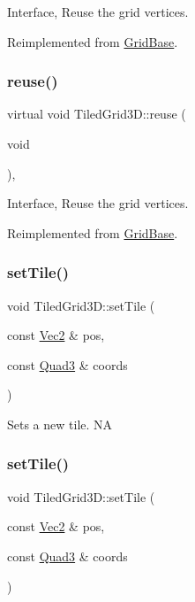 Interface, Reuse the grid vertices. 

Reimplemented from \hyperlink{classGridBase_a3567fe2ec6ea038325944d49a7bde37d}{Grid\+Base}.

\mbox{\label{classTiledGrid3D_a5c415f064b5c2364ff8e27f33784db08}} 
\subsubsection{\texorpdfstring{reuse()}{reuse()}\hspace{0.1cm}{\footnotesize\ttfamily [2/2]}}
{\footnotesize\ttfamily virtual void Tiled\+Grid3\+D\+::reuse (\begin{DoxyParamCaption}\item[{void}]{ }\end{DoxyParamCaption})\hspace{0.3cm}{\ttfamily [override]}, {\ttfamily [virtual]}}

Interface, Reuse the grid vertices. 

Reimplemented from \hyperlink{classGridBase_a3567fe2ec6ea038325944d49a7bde37d}{Grid\+Base}.

\mbox{\label{classTiledGrid3D_ac835fb269e1bd0447c63d645efbb85b8}} 
\subsubsection{\texorpdfstring{set\+Tile()}{setTile()}\hspace{0.1cm}{\footnotesize\ttfamily [1/2]}}
{\footnotesize\ttfamily void Tiled\+Grid3\+D\+::set\+Tile (\begin{DoxyParamCaption}\item[{const \hyperlink{classVec2}{Vec2} \&}]{pos,  }\item[{const \hyperlink{structQuad3}{Quad3} \&}]{coords }\end{DoxyParamCaption})}

Sets a new tile.  NA \mbox{\label{classTiledGrid3D_ac835fb269e1bd0447c63d645efbb85b8}} 
\subsubsection{\texorpdfstring{set\+Tile()}{setTile()}\hspace{0.1cm}{\footnotesize\ttfamily [2/2]}}
{\footnotesize\ttfamily void Tiled\+Grid3\+D\+::set\+Tile (\begin{DoxyParamCaption}\item[{const \hyperlink{classVec2}{Vec2} \&}]{pos,  }\item[{const \hyperlink{structQuad3}{Quad3} \&}]{coords }\end{DoxyParamCaption})}

